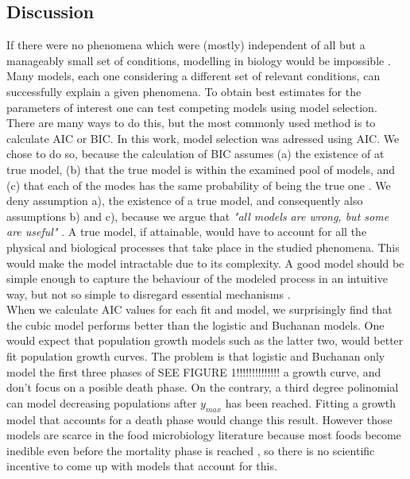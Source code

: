 \documentclass[titlepage,11pt]{article}
\begin{document}
\begin{linenumbers}
	\section{Discussion}
	If there were no phenomena which were (mostly) independent of all but a manageably small set of conditions, modelling in biology would be impossible \cite{Wigner1995}. Many models, each one considering a different set of relevant conditions, can successfully explain a given phenomena.  To obtain best estimates for the parameters of interest one can test competing models using model selection. There are many ways to do this, but the most commonly used method is to calculate AIC or BIC. In this work, model selection was adressed using AIC. We chose to do so, because the calculation of BIC assumes (a) the existence of at true model, (b) that the true model is within the examined pool of models, and (c) that each of the modes has the same probability of being the true one \cite{Johnson2004}. We deny assumption a), the existence of a true model, and consequently also assumptions b) and c), because we argue that  \textit{"all models are wrong, but some are useful"} \cite{Box1976, Box1979}. A true model, if attainable, would have to account for all the physical and biological processes that take place in the studied phenomena. This would make the model intractable due to its complexity. A good model should be simple enough to capture the behaviour of the modeled process in an intuitive way, but not so simple to disregard essential mechanisms \cite{Chatfield1995}. \\
	When we calculate AIC values for each fit and model, we surprisingly find that the cubic model performs better than the logistic and Buchanan models. One would expect that population growth models such as the latter two, would better fit population growth curves. The problem is that logistic and Buchanan only model the first three phases of SEE FIGURE 1!!!!!!!!!!!!!! a growth curve, and don't focus on a posible death phase. On the contrary, a third degree polinomial can model decreasing populations after $ y_{max} $ has been reached. Fitting a growth model that accounts for a death phase \cite{Peleg2009, Baranyi1996} would change this result. However those models are scarce in the food microbiology literature because most foods become inedible even before the mortality phase is reached \cite{Micha2011}, so there is no scientific incentive to come up with models that account for this.\\

\end{linenumbers}
\end{document}
